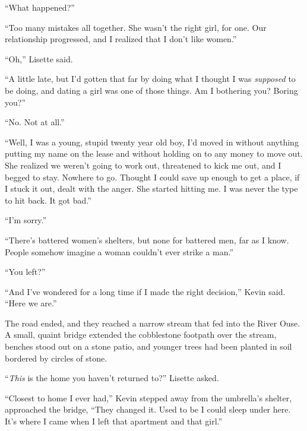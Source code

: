 ``What happened?''



``Too many mistakes all together.  She wasn't the right girl, for one.  Our relationship progressed, and I realized that I don't like women.''



``Oh,'' Lisette said.



``A little late, but I'd gotten that far by doing what I thought I was \emph{supposed} to be doing, and dating a girl was one of those things.  Am I bothering you?  Boring you?''



``No.  Not at all.''



``Well, I was a young, stupid twenty year old boy, I'd moved in without anything putting my name on the lease and without holding on to any money to move out.  She realized we weren't going to work out, threatened to kick me out, and I begged to stay.  Nowhere to go.  Thought I could save up enough to get a place, if I stuck it out, dealt with the anger.  She started hitting me.  I was never the type to hit back.  It got bad.''



``I'm sorry.''



``There's battered women's shelters, but none for battered men, far as I know.  People somehow imagine a woman couldn't ever strike a man.''



``You left?''



``And I've wondered for a long time if I made the right decision,'' Kevin said.  ``Here we are.''



The road ended, and they reached a narrow stream that fed into the River Ouse.  A small, quaint bridge extended the cobblestone footpath over the stream, benches stood out on a stone patio, and younger trees had been planted in soil bordered by circles of stone.



``\emph{This} is the home you haven't returned to?'' Lisette asked.



``Closest to home I ever had,'' Kevin stepped away from the umbrella's shelter, approached the bridge, ``They changed it.  Used to be I could sleep under here.  It's where I came when I left that apartment and that girl.''



